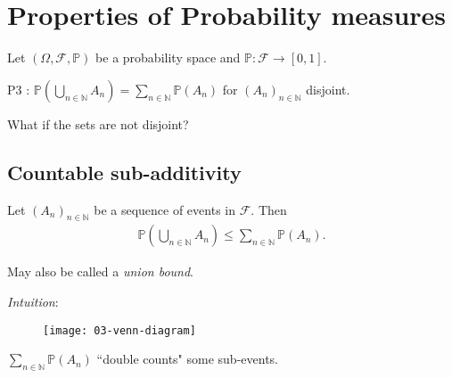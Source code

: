 \section{Properties of Probability measures}
Let $(\Omega, \mathcal{F}, \mathbb{P})$ be a probability space and $\mathbb{P} : \mathcal{F} \to [0, 1]$.

\begin{definition}
    P3 : $\mathbb{P}(\bigcup_{n \in \mathbb{N}} A_n) = \sum_{n \in \mathbb{N}} \mathbb{P}(A_n)$ for $(A_n)_{n \in \mathbb{N}}$ disjoint.
\end{definition} 

\begin{question}
    What if the sets are not disjoint?
\end{question} 

\subsection{Countable sub-additivity}

\begin{proposition} \label{prp:subadditivity}
    Let $(A_n)_{n \in \mathbb{N}}$ be a sequence of events in $\mathcal{F}$.
    Then
    \begin{align*}
        \mathbb{P}\left(\bigcup_{n \in \mathbb{N}} A_n\right) \leq \sum_{n \in \mathbb{N}} \mathbb{P}(A_n).
    \end{align*} 
\end{proposition} 

May also be called a \emph{union bound}.

\emph{Intuition}:
\begin{figure}[h] 
    \centering 
    \texttt{[image: 03-venn-diagram]} 
\end{figure}

$\sum_{n \in \mathbb{N}} \mathbb{P}(A_n)$ ``double counts" some sub-events.

